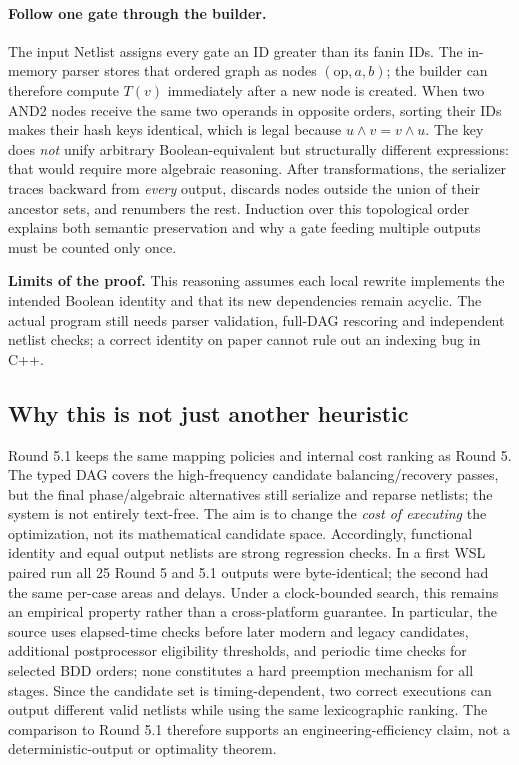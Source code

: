 \documentclass[a4paper,10pt]{article}
\theoremstyle{definition}
\theoremstyle{remark}
\begin{document}
\paragraph{Follow one gate through the builder.} The input Netlist assigns every gate an ID greater than its fanin IDs. The in-memory parser stores that ordered graph as nodes $(\mathrm{op},a,b)$; the builder can therefore compute $T(v)$ immediately after a new node is created. When two AND2 nodes receive the same two operands in opposite orders, sorting their IDs makes their hash keys identical, which is legal because $u\land v=v\land u$. The key does \emph{not} unify arbitrary Boolean-equivalent but structurally different expressions: that would require more algebraic reasoning. After transformations, the serializer traces backward from \emph{every} output, discards nodes outside the union of their ancestor sets, and renumbers the rest. Induction over this topological order explains both semantic preservation and why a gate feeding multiple outputs must be counted only once.\par
\textbf{Limits of the proof.} This reasoning assumes each local rewrite implements the intended Boolean identity and that its new dependencies remain acyclic. The actual program still needs parser validation, full-DAG rescoring and independent netlist checks; a correct identity on paper cannot rule out an indexing bug in C++.

\subsection{Why this is not just another heuristic}
Round 5.1 keeps the same mapping policies and internal cost ranking as Round 5. The typed DAG covers the high-frequency candidate balancing/recovery passes, but the final phase/algebraic alternatives still serialize and reparse netlists; the system is not entirely text-free. The aim is to change the \emph{cost of executing} the optimization, not its mathematical candidate space. Accordingly, functional identity and equal output netlists are strong regression checks. In a first WSL paired run all 25 Round 5 and 5.1 outputs were byte-identical; the second had the same per-case areas and delays. Under a clock-bounded search, this remains an empirical property rather than a cross-platform guarantee. In particular, the source uses elapsed-time checks before later modern and legacy candidates, additional postprocessor eligibility thresholds, and periodic time checks for selected BDD orders; none constitutes a hard preemption mechanism for all stages. Since the candidate set is timing-dependent, two correct executions can output different valid netlists while using the same lexicographic ranking. The comparison to Round 5.1 therefore supports an engineering-efficiency claim, not a deterministic-output or optimality theorem.
\end{document}
